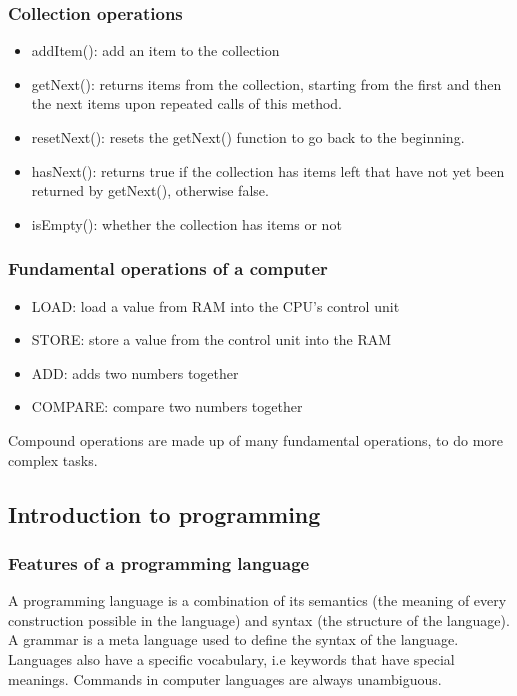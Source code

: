 \documentclass{article}
\begin{document}
\subsubsection{Collection operations}
\begin{itemize}
    \item addItem(): add an item to the collection
    \item getNext(): returns items from the collection, starting from the first
        and then the next items upon repeated calls of this method.
    \item resetNext(): resets the getNext() function to go back to the
        beginning.
    \item hasNext(): returns true if the collection has items left that have
        not yet been returned by getNext(), otherwise false.
    \item isEmpty(): whether the collection has items or not
\end{itemize}

\subsubsection{Fundamental operations of a computer}
\begin{itemize}
    \item LOAD: load a value from RAM into the CPU's control unit
    \item STORE: store a value from the control unit into the RAM
    \item ADD: adds two numbers together
    \item COMPARE: compare two numbers together
\end{itemize}

Compound operations are made up of many fundamental operations, to do more
complex tasks.

\subsection{Introduction to programming}

\subsubsection{Features of a programming language}
A programming language is a combination of its semantics (the meaning of every
construction possible in the language) and syntax (the structure of the
language). A grammar is a meta language used to define the syntax of the
language. Languages also have a specific vocabulary, i.e keywords that have
special meanings. Commands in computer languages are always unambiguous.
\end{document}
